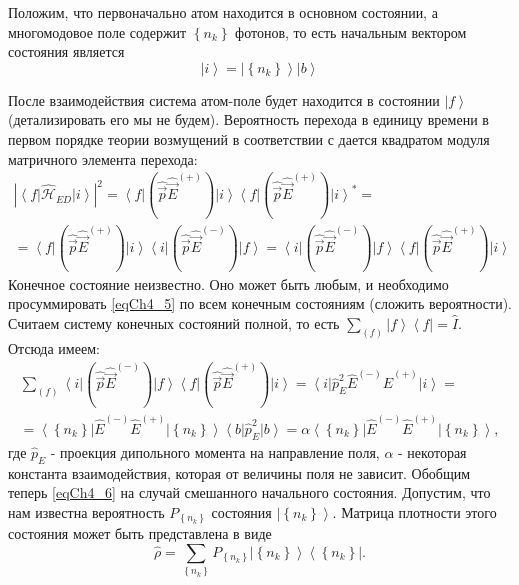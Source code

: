 Положим, что первоначально атом находится в основном состоянии, а
многомодовое поле содержит $\left\{n_k\right\}$ фотонов, то есть начальным
вектором состояния является 
\begin{equation}
\left|i\right> = \left|\left\{n_k\right\}\right> \left|b\right>
\label{eqCh4_4}
\end{equation}

После взаимодействия система атом-поле будет находится в состоянии
$\left|f\right>$ (детализировать его мы не будем). Вероятность
перехода в единицу времени в первом порядке теории возмущений в
соответствии с 
дается квадратом модуля матричного элемента перехода: 
\begin{eqnarray}
\left|\left<f\right|\hat{\mathcal{H}}_{ED}\left|i\right>\right|^2 =
\left<f\right|\left(\hat{\vec{p}}\hat{\vec{E}}^{(+)}\right)\left|i\right>
\left<f\right|\left(\hat{\vec{p}}\hat{\vec{E}}^{(+)}\right)\left|i\right>^{*}
= 
\nonumber \\
=
\left<f\right|\left(\hat{\vec{p}}\hat{\vec{E}}^{(+)}\right)\left|i\right>
\left<i\right|\left(\hat{\vec{p}}\hat{\vec{E}}^{(-)}\right)\left|f\right>
=
\left<i\right|\left(\hat{\vec{p}}\hat{\vec{E}}^{(-)}\right)\left|f\right>
\left<f\right|\left(\hat{\vec{p}}\hat{\vec{E}}^{(+)}\right)\left|i\right>
\label{eqCh4_5}
\end{eqnarray}
Конечное состояние неизвестно. Оно может быть любым, и необходимо
просуммировать \eqref{eqCh4_5} по всем конечным состояниям (сложить
вероятности). Считаем систему конечных состояний полной, то есть  
$\sum_{(f)} \left|f\right>\left<f\right| = \hat{I}$.
Отсюда имеем: 
\begin{eqnarray}
\sum_{(f)}
\left<i\right|\left(\hat{\vec{p}}\hat{\vec{E}}^{(-)}\right)\left|f\right>
\left<f\right|\left(\hat{\vec{p}}\hat{\vec{E}}^{(+)}\right)\left|i\right>
= 
\left<i\right|\hat{p}_E^2\hat{E}^{(-)}\hat{E}^{(+)}\left|i\right> = 
\nonumber \\
=
\left<\left\{n_k\right\}\right|\hat{E}^{(-)}\hat{E}^{(+)}\left|\left\{n_k\right\}\right>\left<b\right|\hat{p}_E^2\left|b\right>
= 
\alpha \left<\left\{n_k\right\}\right|\hat{E}^{(-)}\hat{E}^{(+)}\left|\left\{n_k\right\}\right>,
\label{eqCh4_6}
\end{eqnarray}
где $\hat{p}_E$ -  проекция дипольного момента на направление поля,
$\alpha$ - некоторая константа взаимодействия, которая от величины
поля не зависит. Обобщим теперь \eqref{eqCh4_6} на случай смешанного
начального состояния. Допустим, что нам известна вероятность
$P_{\left\{n_k\right\}}$ состояния  $\left|\left\{n_k\right\}\right>$.
Матрица плотности этого состояния может быть представлена в виде 
\begin{equation}
\hat{\rho} = \sum_{\left\{n_k\right\}}P_{\left\{n_k\right\}}
\left|\left\{n_k\right\}\right>\left<\left\{n_k\right\}\right|.
\label{eqCh4_7}
\end{equation}

